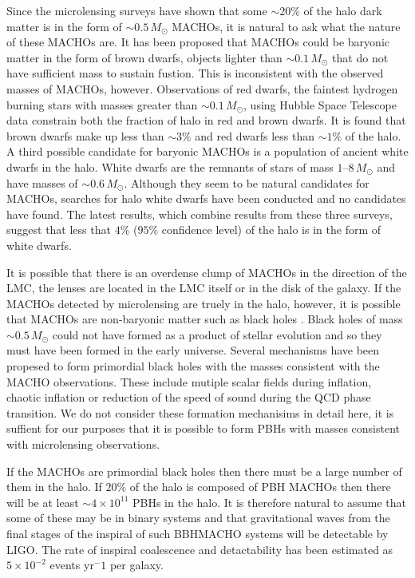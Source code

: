 Since the microlensing surveys have shown that some $\sim 20\%$ of the halo
dark matter is in the form of $\sim 0.5\,M_\odot$ MACHOs, it is natural to ask
what the nature of these MACHOs are. It has been proposed that MACHOs could be
baryonic matter in the form of brown dwarfs, objects lighter than $\sim
0.1\,M_\odot$ that do not have sufficient mass to sustain fustion. This is
inconsistent with the observed masses of MACHOs, however. Observations of red
dwarfs, the faintest hydrogen burning stars with masses greater than $\sim
0.1\,M_\odot$, using Hubble Space Telescope data constrain both the fraction
of halo in red and brown dwarfs. It is found that brown dwarfs make up less
than $\sim 3\%$ and red dwarfs less than $\sim 1\%$ of the 
halo\cite{Graff:1995ru,Graff:1996rz}.  A third possible candidate for baryonic
MACHOs is a population of ancient white dwarfs in the halo. White dwarfs are 
the remnants of stars of mass $1$--$8\,M_\odot$ and have masses of $\sim
0.6\,M_\odot$. Although they seem to be natural candidates for MACHOs, searches
for halo white dwarfs have been conducted and no candidates have
found\cite{2002A&A...389L..69G,2002ApJ...573..644N,Creze:2004gs}. The latest
results, which combine results from these three surveys, suggest that less
that $4\%$ ($95\%$ confidence level) of the halo is in the form of white
dwarfs\cite{Creze:2004gs}. 

It is possible that there is an overdense clump of MACHOs in the direction of
the LMC\cite{1996ApJ...473L..99N}, the lenses are located in the LMC
itself\cite{Salati:1999gd} or in the disk of the galaxy\cite{Evans:1997hq}. 
If the MACHOs detected by microlensing are truely in the halo, however, it is
possible that MACHOs are non-baryonic matter such as black holes
\cite{Finn:1996dd,Nakamura:1997sm}. Black holes of mass $\sim 0.5\,M_\odot$
could not have formed as a product of stellar evolution and so they must have
been formed in the early universe\cite{1967SvA....10..602Z,1974MNRAS.168..399C}.
Several mechanisms have been propesed to form primordial black holes with the
masses consistent with the MACHO observations. These include mutiple scalar
fields during inflation\cite{Yokoyama:1995ex}, chaotic 
inflation\cite{Yokoyama:1999xi} or reduction of the speed of sound during the
QCD phase transition\cite{Jedamzik:1996mr}. We do not consider these formation
mechanisims in detail here, it is suffient for our purposes that it is
possible to form PBHs with masses consistent with microlensing observations.

If the MACHOs are primordial black holes then there must be a large number of
them in the halo. If $20\%$ of the halo is composed of PBH MACHOs then there
will be at least $\sim 4 \times 10^{11}$ PBHs in the halo. It is therefore
natural to assume that some of these may be in binary systems and that
gravitational waves from the final stages of the inspiral of such BBHMACHO
systems will be detectable by LIGO. The rate of inspiral coalescence and
detactability has been estimated as $5\times 10 ^{-2}$ events yr$^-1$ per
galaxy\cite{Nakamura:1997sm}.

